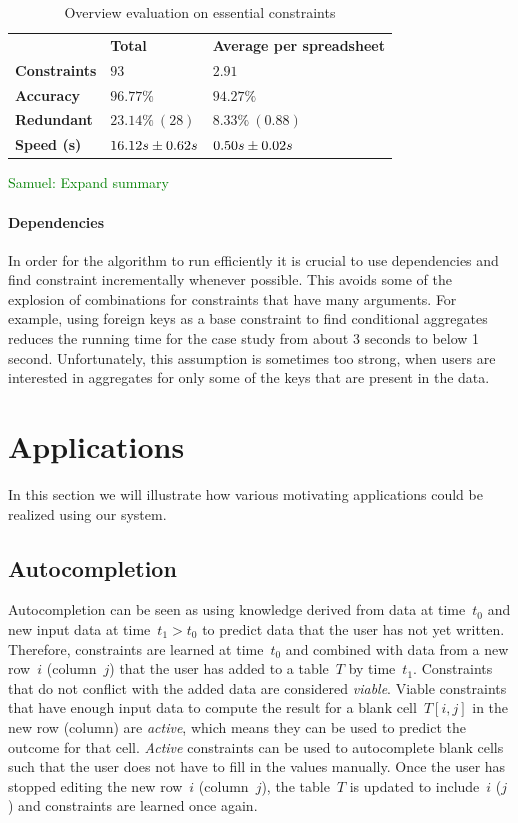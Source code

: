 \documentclass{sig-alternate-05-2015}
\newcommand{\samuel}[1]{\textcolor{green}{{\sc Samuel:} #1}\xspace}
\begin{document}
\begin{table}
  \centering
  \begin{tabular}{lll}
    & \textbf{Total} & \textbf{Average per spreadsheet} \\
    \textbf{Constraints} & $93$ & $2.91$ \\
    \textbf{Accuracy} & $96.77\%$ & $94.27\%$ \\
    \textbf{Redundant} & $23.14\%~(28)$ & $8.33\%~(0.88)$ \\
    \textbf{Speed (s)} & ${16.12}s \pm {0.62}s$ & ${0.50}s \pm {0.02}s$
  \end{tabular}
  \caption{Overview evaluation on essential constraints}
\end{table}
\samuel{Expand summary}

\paragraph{Dependencies}
In order for the algorithm to run efficiently it is crucial to use dependencies and find constraint incrementally whenever possible.
This avoids some of the explosion of combinations for constraints that have many arguments.
For example, using foreign keys as a base constraint to find conditional aggregates reduces the running time for the case study from about 3 seconds to below 1 second.
Unfortunately, this assumption is sometimes too strong, when users are interested in aggregates for only some of the keys that are present in the data.

\section{Applications}
In this section we will illustrate how various motivating applications could be realized using our system.

\subsection{Autocompletion}
Autocompletion can be seen as using knowledge derived from data at time~$t_0$ and new input data at time~$t_1 > t_0$ to predict data that the user has not yet written.
Therefore, constraints are learned at time~$t_0$ and combined with data from a new row~$i$ (column~$j$) that the user has added to a table~$T$ by time~$t_1$.
Constraints that do not conflict with the added data are considered \textit{viable}.
Viable constraints that have enough input data to compute the result for a blank cell~$T[i,j]$ in the new row (column) are \textit{active}, which means they can be used to predict the outcome for that cell.
\textit{Active} constraints can be used to autocomplete blank cells such that the user does not have to fill in the values manually.
Once the user has stopped editing the new row~$i$ (column~$j$), the table~$T$ is updated to include~$i$ ($j$) and constraints are learned once again.
\end{document}
